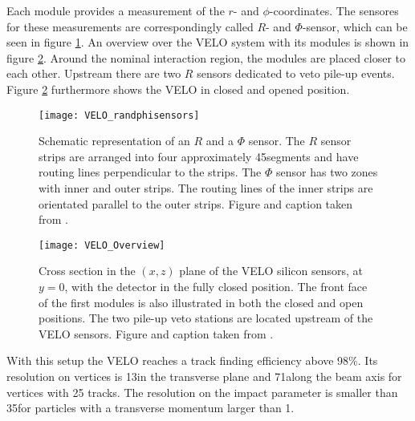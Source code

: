Each module provides a measurement of the $r$- and $\phi$-coordinates.
The sensores for these measurements are correspondingly called $R$- and $\Phi$-sensor, which can be seen in figure \ref{fig:VELO_RandPhiSensor}.
An overview over the VELO system with its modules is shown in figure \ref{fig:VELO_Overview}. 
Around the nominal interaction region, the modules are placed closer to each other. 
Upstream there are two $R$ sensors dedicated to veto pile-up events. 
Figure \ref{fig:VELO_Overview} furthermore shows the VELO in closed and opened position.
\begin{figure}[hptb]
    \centering
	\texttt{[image: VELO\_randphisensors]}	
	\caption{Schematic representation of an $R$ and a $\Phi$ sensor. The $R$ sensor strips are arranged into four approximately 45\degrees segments and have routing lines perpendicular to the strips. The $\Phi$ sensor has two zones with inner and outer strips. The routing lines of the inner strips
    are orientated parallel to the outer strips. Figure and caption taken from \cite{VELO_Performance}.}
	\label{fig:VELO_RandPhiSensor}
\end{figure}
\begin{figure}[hptb]
    \centering
	\texttt{[image: VELO\_Overview]}	
	\caption{Cross section in the $(x,z)$ plane of the VELO silicon sensors, at $y=0$, with the detector in the fully closed position. 
             The front face of the first modules is also illustrated in both the closed and open positions. 
             The two pile-up veto stations are located upstream of the VELO sensors.
             Figure and caption taken from \cite{detector}.}
	\label{fig:VELO_Overview}
\end{figure}
With this setup the VELO reaches a track finding efficiency above 98\%. 
Its resolution on vertices is 13\mum in the transverse plane and 71\mum along the beam axis for vertices with 25 tracks. 
The resolution on the impact parameter is smaller than 35\mum for particles with a transverse momentum larger than 1\gev \cite{detector, VELO_TDR, VELO_Performance}.

